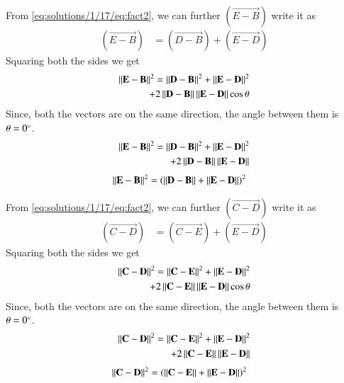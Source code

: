 	From \eqref{eq:solutions/1/17/eq:fact2}, we can further $(\vec{E-B})$ write it as 
	\begin{align}\label{eq:solutions/1/17/eq:eq5}
		(\vec{E-B}) &= (\vec{D-B}) + (\vec{E-D})
	\end{align}
	Squaring both the sides we get
	\begin{align} \label{eq:solutions/1/17/eq:eq6}
		\left\lVert\mathbf{E}-\mathbf{B}\right\rVert^{2} = \left\lVert\mathbf{D}-\mathbf{B}\right\rVert^{2} + \left\lVert\mathbf{E}-\mathbf{D}\right\rVert^{2} \nonumber \\ + 2\left\lVert\mathbf{D}-\mathbf{B}\right\rVert\left\lVert\mathbf{E}-\mathbf{D}\right\rVert\cos\theta
	\end{align}
	Since, both the vectors are on the same direction, the angle between them is $\theta = 0\degree$.
	\begin{align} \label{eq:solutions/1/17/eq:eq7}
		\left\lVert\mathbf{E}-\mathbf{B}\right\rVert^{2} = \left\lVert\mathbf{D}-\mathbf{B}\right\rVert^{2} + \left\lVert\mathbf{E}-\mathbf{D}\right\rVert^{2} \nonumber \\ + 2\left\lVert\mathbf{D}-\mathbf{B}\right\rVert\left\lVert\mathbf{E}-\mathbf{D}\right\rVert
	\end{align}
	\begin{align}\label{eq:solutions/1/17/eq:eq8}
		\left\lVert\mathbf{E}-\mathbf{B}\right\rVert^{2} &= \left(\left\lVert\mathbf{D}-\mathbf{B}\right\rVert + \left\lVert\mathbf{E}-\mathbf{D}\right\rVert\right)^{2}
	\end{align}

	From \eqref{eq:solutions/1/17/eq:fact2}, we can further $(\vec{C-D})$ write it as
	\begin{align}\label{eq:solutions/1/17/eq:eq9}
		(\vec{C-D}) &= (\vec{C-E}) + (\vec{E-D})
	\end{align}
	Squaring both the sides we get
	\begin{align} \label{eq:solutions/1/17/eq:eq10}
		\left\lVert\mathbf{C}-\mathbf{D}\right\rVert^{2} = \left\lVert\mathbf{C}-\mathbf{E}\right\rVert^{2} + \left\lVert\mathbf{E}-\mathbf{D}\right\rVert^{2} \nonumber \\ + 2\left\lVert\mathbf{C}-\mathbf{E}\right\rVert\left\lVert\mathbf{E}-\mathbf{D}\right\rVert\cos\theta
	\end{align}
	Since, both the vectors are on the same direction, the angle between them is $\theta = 0\degree$.
	\begin{align} \label{eq:solutions/1/17/eq:eq11}
		\left\lVert\mathbf{C}-\mathbf{D}\right\rVert^{2} = \left\lVert\mathbf{C}-\mathbf{E}\right\rVert^{2} + \left\lVert\mathbf{E}-\mathbf{D}\right\rVert^{2} \nonumber \\ + 2\left\lVert\mathbf{C}-\mathbf{E}\right\rVert\left\lVert\mathbf{E}-\mathbf{D}\right\rVert
	\end{align}
	\begin{align}\label{eq:solutions/1/17/eq:eq12}
		\left\lVert\mathbf{C}-\mathbf{D}\right\rVert^{2} &= \left(\left\lVert\mathbf{C}-\mathbf{E}\right\rVert + \left\lVert\mathbf{E}-\mathbf{D}\right\rVert\right)^{2}
	\end{align}

